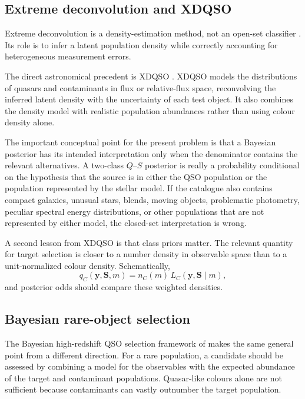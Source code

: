\documentclass[11pt]{article}
\begin{document}
\subsection{Extreme deconvolution and XDQSO}

Extreme deconvolution is a density-estimation method, not an open-set
classifier \citep{bovy2011xd}. Its role is to infer a latent population
density while correctly accounting for heterogeneous measurement errors.

The direct astronomical precedent is XDQSO
\citep{bovy2011xdqso}. XDQSO models the distributions of quasars and
contaminants in flux or relative-flux space, reconvolving the inferred latent
density with the uncertainty of each test object. It also combines the
density model with realistic population abundances rather than using colour
density alone.

The important conceptual point for the present problem is that a Bayesian
posterior has its intended interpretation only when the denominator contains
the relevant alternatives. A two-class $Q$--$S$ posterior is really a
probability conditional on the hypothesis that the source is in either the
QSO population or the population represented by the stellar model. If the
catalogue also contains compact galaxies, unusual stars, blends, moving
objects, problematic photometry, peculiar spectral energy distributions, or
other populations that are not represented by either model, the closed-set
interpretation is wrong.

A second lesson from XDQSO is that class priors matter. The relevant quantity
for target selection is closer to a number density in observable space than
to a unit-normalized colour density. Schematically,
%
\begin{equation}
q_C(\bm{y},\bm{S},m)
=
n_C(m)\,L_C(\bm{y},\bm{S}\mid m),
\end{equation}
%
and posterior odds should compare these weighted densities.

\subsection{Bayesian rare-object selection}

The Bayesian high-redshift QSO selection framework of
\citet{mortlock2012} makes the same general point from a different direction.
For a rare population, a candidate should be assessed by combining a model
for the observables with the expected abundance of the target and contaminant
populations. Quasar-like colours alone are not sufficient because contaminants
can vastly outnumber the target population.
\end{document}
